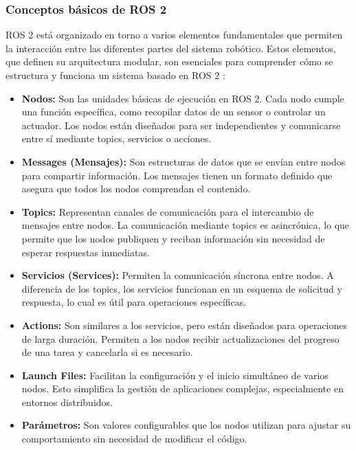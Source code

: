     \subsubsection{Conceptos básicos de ROS 2}
    
    ROS 2 está organizado en torno a varios elementos fundamentales que permiten la interacción entre las diferentes partes del sistema robótico. Estos elementos, que definen su arquitectura modular, son esenciales para comprender cómo se estructura y funciona un sistema basado en ROS 2 \cite{ros_docs}:  
    
    \begin{itemize}
        \item \textbf{Nodos:} Son las unidades básicas de ejecución en ROS 2. Cada nodo cumple una función específica, como recopilar datos de un sensor o controlar un actuador. Los nodos están diseñados para ser independientes y comunicarse entre sí mediante topics, servicios o acciones.  
        \item \textbf{Messages (Mensajes):} Son estructuras de datos que se envían entre nodos para compartir información. Los mensajes tienen un formato definido que asegura que todos los nodos comprendan el contenido.  
        \item \textbf{Topics:} Representan canales de comunicación para el intercambio de mensajes entre nodos. La comunicación mediante topics es asincrónica, lo que permite que los nodos publiquen y reciban información sin necesidad de esperar respuestas inmediatas.  
        \item \textbf{Servicios (Services):} Permiten la comunicación síncrona entre nodos. A diferencia de los topics, los servicios funcionan en un esquema de solicitud y respuesta, lo cual es útil para operaciones específicas.  
        \item \textbf{Actions:} Son similares a los servicios, pero están diseñados para operaciones de larga duración. Permiten a los nodos recibir actualizaciones del progreso de una tarea y cancelarla si es necesario.  
        \item \textbf{Launch Files:} Facilitan la configuración y el inicio simultáneo de varios nodos. Esto simplifica la gestión de aplicaciones complejas, especialmente en entornos distribuidos.  
        \item \textbf{Parámetros:} Son valores configurables que los nodos utilizan para ajustar su comportamiento sin necesidad de modificar el código.  
    \end{itemize}
    
